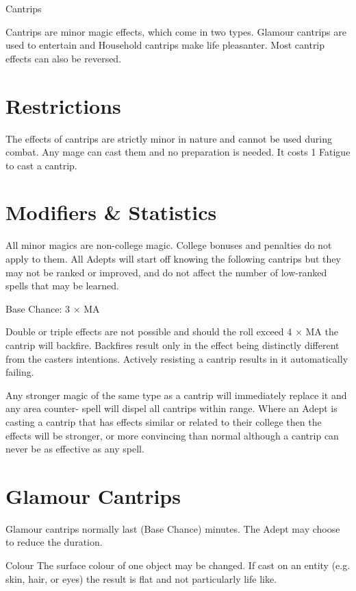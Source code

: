 \begin{Chapter}{Cantrips}

Cantrips  are  minor  magic  effects,  which  come  in 
two  types.  Glamour  cantrips  are  used  to  entertain 
and Household cantrips make life pleasanter. Most 
cantrip effects can also be reversed. 

\section{Restrictions}

The effects of cantrips are strictly minor in nature and cannot be
used during combat. Any mage can cast them and no preparation is
needed.  It costs 1 Fatigue to cast a cantrip.

\section{Modifiers \& Statistics}

All minor magics are non-college magic.  College bonuses and penalties
do not apply to them.  All Adepts will start off knowing the following
cantrips but they may not be ranked or improved, and do not affect the
number of low-ranked spells that may be learned.

Base Chance: 3 × MA 

Double or triple effects are not possible and should the roll exceed 4
× MA the cantrip will backfire.  Backfires result only in the effect
being distinctly different from the casters intentions.  Actively
resisting a cantrip results in it automatically failing.

Any stronger magic of the same type as a cantrip will immediately
replace it and any area counter- spell will dispel all cantrips within
range. Where an Adept is casting a cantrip that has effects similar or
related to their college then the effects will be stronger, or more
convincing than normal although a cantrip can never be as effective as
any spell.

\section{Glamour Cantrips}

Glamour cantrips normally last (Base Chance) minutes.  The Adept may
choose to reduce the duration.

Colour  The  surface  colour  of  one  object  may  be 
changed.  If  cast  on  an  entity  (e.g.  skin,  hair,  or 
eyes) the result is flat and not particularly life like. 


\end{Chapter}
